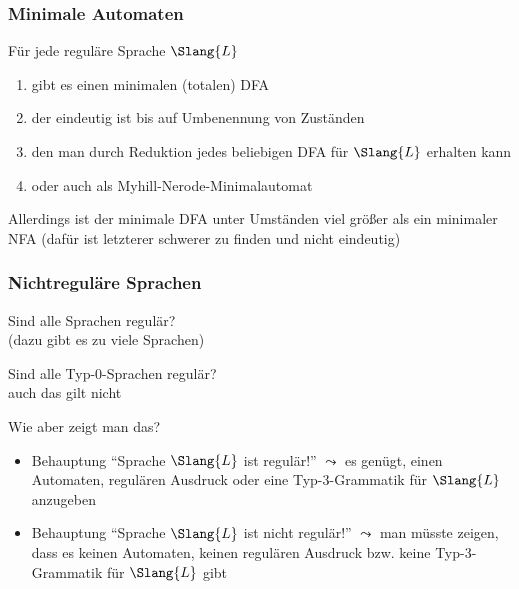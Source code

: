 \documentclass[aspectratio=1610,onlymath]{beamer}
\begin{document}
\maketitle


\begin{frame}\frametitle{Minimale Automaten}

Für jede reguläre Sprache $\Slang{L}$
\begin{enumerate}[\ldots]
\item gibt es einen minimalen (totalen) DFA 
\item der eindeutig ist bis auf Umbenennung von Zuständen
\item den man durch Reduktion jedes beliebigen DFA für $\Slang{L}$ erhalten kann
\item oder auch als Myhill-Nerode-Minimalautomat
\end{enumerate}
\bigskip

Allerdings ist der minimale DFA unter Umständen viel größer als ein minimaler NFA
(dafür ist letzterer schwerer zu finden und nicht eindeutig)

\end{frame}



\begin{frame}\frametitle{Nichtreguläre Sprachen}

Sind alle Sprachen regulär?\\
 (dazu gibt es zu viele Sprachen)
\bigskip

Sind alle Typ-0-Sprachen regulär?\\
 auch das gilt nicht
\bigskip

\alert{Wie aber zeigt man das?}
\begin{itemize}
\item Behauptung "`Sprache $\Slang{L}$ ist regulär!"' $\leadsto$ es genügt, \alert{einen} Automaten, regulären Ausdruck oder eine Typ-3-Grammatik für $\Slang{L}$ anzugeben
\item Behauptung "`Sprache $\Slang{L}$ ist nicht regulär!"' $\leadsto$ man müsste zeigen, dass es \alert{keinen} Automaten, \alert{keinen} regulären Ausdruck bzw. \alert{keine} Typ-3-Grammatik für $\Slang{L}$ gibt
\end{itemize}

\end{frame}
\end{document}
